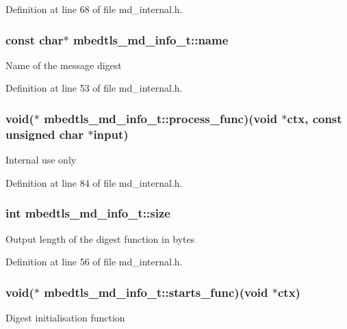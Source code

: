 Definition at line 68 of file md\-\_\-internal.\-h.

\hypertarget{structmbedtls__md__info__t_a91340331832845c885d99884426d21c6}{
\subsubsection[{name}]{\setlength{\rightskip}{0pt plus 5cm}const char$\ast$ mbedtls\-\_\-md\-\_\-info\-\_\-t\-::name}}\label{structmbedtls__md__info__t_a91340331832845c885d99884426d21c6}
Name of the message digest 

Definition at line 53 of file md\-\_\-internal.\-h.

\hypertarget{structmbedtls__md__info__t_af583a5095ca99579f441d2ba0e1accb8}{
\subsubsection[{process\-\_\-func}]{\setlength{\rightskip}{0pt plus 5cm}void($\ast$ mbedtls\-\_\-md\-\_\-info\-\_\-t\-::process\-\_\-func)(void $\ast$ctx, const unsigned char $\ast$input)}}\label{structmbedtls__md__info__t_af583a5095ca99579f441d2ba0e1accb8}
Internal use only 

Definition at line 84 of file md\-\_\-internal.\-h.

\hypertarget{structmbedtls__md__info__t_a17a6641cfc5d4e7542d450463c4122f6}{
\subsubsection[{size}]{\setlength{\rightskip}{0pt plus 5cm}int mbedtls\-\_\-md\-\_\-info\-\_\-t\-::size}}\label{structmbedtls__md__info__t_a17a6641cfc5d4e7542d450463c4122f6}
Output length of the digest function in bytes 

Definition at line 56 of file md\-\_\-internal.\-h.

\hypertarget{structmbedtls__md__info__t_a69899182d91a8dbc034bfcf8b87517e6}{
\subsubsection[{starts\-\_\-func}]{\setlength{\rightskip}{0pt plus 5cm}void($\ast$ mbedtls\-\_\-md\-\_\-info\-\_\-t\-::starts\-\_\-func)(void $\ast$ctx)}}\label{structmbedtls__md__info__t_a69899182d91a8dbc034bfcf8b87517e6}
Digest initialisation function 

